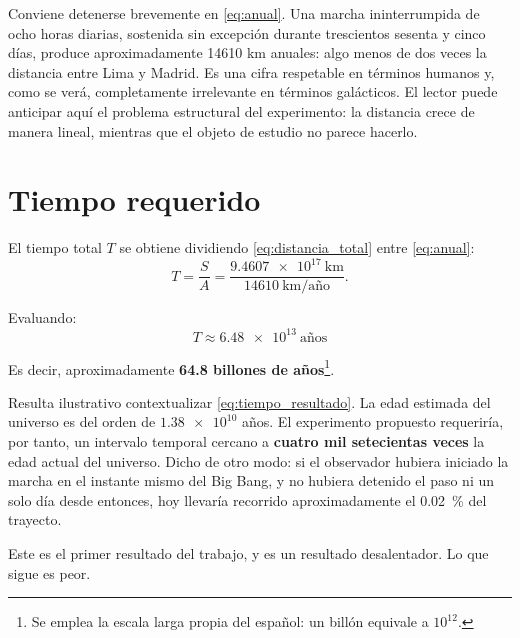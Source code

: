 \documentclass[conference]{IEEEtran}
\begin{document}
Conviene detenerse brevemente en \eqref{eq:anual}. Una marcha ininterrumpida de
ocho horas diarias, sostenida sin excepción durante trescientos sesenta y
cinco días, produce aproximadamente \num{14610} km anuales: algo menos de dos
veces la distancia entre Lima y Madrid. Es una cifra respetable en términos
humanos y, como se verá, completamente irrelevante en términos galácticos. El
lector puede anticipar aquí el problema estructural del experimento: la
distancia crece de manera lineal, mientras que el objeto de estudio no parece
hacerlo.

\section{Tiempo requerido}
\label{sec:tiempo}

El tiempo total $T$ se obtiene dividiendo \eqref{eq:distancia_total} entre
\eqref{eq:anual}:
\begin{equation}
T = \frac{S}{A}
  = \frac{\num{9.4607e17}\ \text{km}}{\num{14610}\ \text{km/año}}.
\label{eq:tiempo_def}
\end{equation}

Evaluando:
\begin{equation}
\boxed{\,T \approx \num{6.48e13}\ \text{años}\,}
\label{eq:tiempo_resultado}
\end{equation}

Es decir, aproximadamente \textbf{64.8 billones de años}\footnote{Se emplea la
escala larga propia del español: un billón equivale a $10^{12}$.}.

Resulta ilustrativo contextualizar \eqref{eq:tiempo_resultado}. La edad
estimada del universo es del orden de $\num{1.38e10}$ años. El experimento
propuesto requeriría, por tanto, un intervalo temporal cercano a
\textbf{cuatro mil setecientas veces} la edad actual del universo. Dicho de
otro modo: si el observador hubiera iniciado la marcha en el instante mismo del
Big Bang, y no hubiera detenido el paso ni un solo día desde entonces, hoy
llevaría recorrido aproximadamente el \qty{0.02}{\percent} del trayecto.

Este es el primer resultado del trabajo, y es un resultado desalentador. Lo
que sigue es peor.

\end{document}
